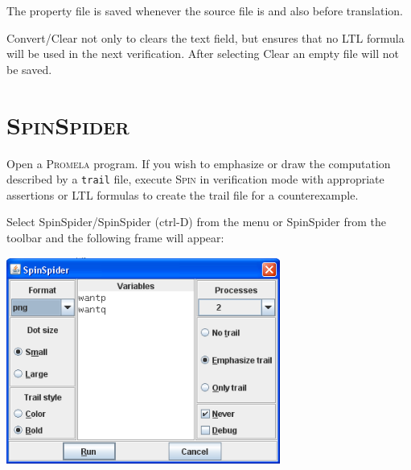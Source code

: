 \documentclass[11pt]{article}
\newcommand{\spn}{\textsc{Spin}}
\newcommand{\prm}{\textsc{Promela}}
\newcommand{\spd}{\textsc{SpinSpider}}
\newcommand{\p}[1]{\texttt{#1}}
\newcommand{\bu}[1]{\textsf{#1}}
\begin{document}
The property file is saved whenever the source file is
and also before translation.

\bu{Convert/Clear} not only to clears the text field, but ensures that
no LTL formula will be used in the next verification.
After selecting \bu{Clear} an empty file will not be saved.

\section{\spd{}}
Open a \prm{} program. If you wish to emphasize or draw the computation
described by a \p{trail} file, execute \spn{} in verification mode with
appropriate assertions or LTL formulas to create the trail file for a counterexample.

Select \bu{SpinSpider/SpinSpider} (\bu{ctrl-D}) from the menu or \bu{SpinSpider}
from the toolbar and the following frame will appear:
\begin{center}
\includegraphics[width=9cm,keepaspectratio=true]{spd.png}
\end{center}
\end{document}
